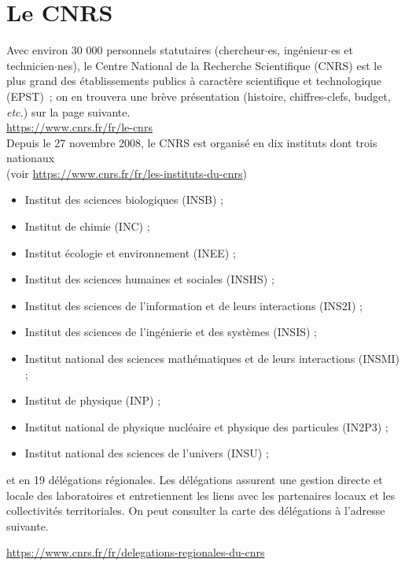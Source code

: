 



\chapter{Le CNRS}
\label{CNRS}



Avec environ 30 000 personnels statutaires (chercheur$\cdot$es, ing\'enieur$\cdot$es et technicien$\cdot$nes), le Centre National de la
Recherche Scientifique (CNRS) est le plus grand des
\'etablissements publics \`a caract\`ere scientifique et
technologique (EPST)~; on en trouvera une br\`eve pr\'esentation
(histoire, chiffres-clefs, budget, {\em etc.}) sur la page suivante.\\
\url{https://www.cnrs.fr/fr/le-cnrs}\\
Depuis le 27 novembre 2008, le CNRS est organis\'e
en dix instituts dont trois nationaux\\
(voir \url{https://www.cnrs.fr/fr/les-instituts-du-cnrs})
\begin{itemize}
\item Institut des sciences biologiques (INSB) ;
\item Institut de chimie (INC) ;
\item Institut \'ecologie et environnement (INEE) ;
\item Institut des sciences humaines et sociales (INSHS) ;
\item Institut des sciences de l'information et de leurs interactions (INS2I) ;
\item Institut des sciences de l'ing\'enierie et des syst\`emes (INSIS) ;
\item Institut national des sciences math\'ematiques et de leurs interactions (INSMI) ;
\item Institut de physique (INP) ;
\item Institut national de physique nucl\'eaire et physique des particules (IN2P3) ;
\item Institut national des sciences de l'univers (INSU) ;
\end{itemize}
et en 19 d\'el\'egations r\'egionales. Les d\'el\'egations assurent
une gestion directe et locale des laboratoires et entretiennent les
liens avec les partenaires locaux et les collectivit\'es
territoriales. On peut consulter la carte des d\'el\'egations \`a
l'adresse suivante. 

\url{https://www.cnrs.fr/fr/delegations-regionales-du-cnrs}

